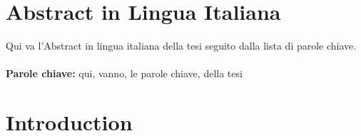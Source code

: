 \documentclass{Configuration_Files/PoliMi3i_thesis}
\begin{document}
    \chapter*{Abstract in Lingua Italiana}
    Qui va l'Abstract in lingua italiana della tesi seguito dalla lista di parole chiave.
    \\
    \\
    \textbf{Parole chiave:} qui, vanno, le parole chiave, della tesi %


    \thispagestyle{empty}
    \tableofcontents %
    \thispagestyle{empty}
    \cleardoublepage

%
%
%    
%

    \mainmatter %


    \chapter{Introduction}
    \label{ch:chapter_one}%
\end{document}
